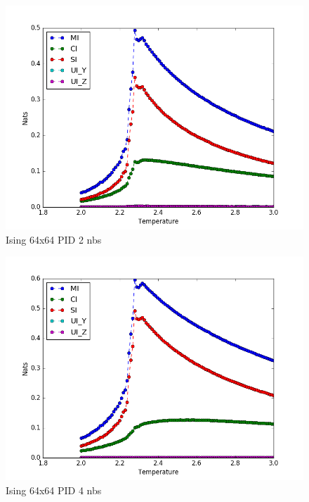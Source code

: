 \documentclass[12pt]{article}
\begin{document}
\begin{figure} [h!]
\begin{center}
\includegraphics[width=\textwidth]{ising-64-pid-2-nbs}
\caption{Ising 64x64 PID 2 nbs}
\label{fig:ising-64-pid-2-nbs}
\end{center}
\end{figure}

\begin{figure} [h!]
\begin{center}
\includegraphics[width=\textwidth]{ising-64-pid-4-nbs}
\caption{Ising 64x64 PID 4 nbs}
\label{fig:ising-64-pid-4-nbs}
\end{center}
\end{figure}
\end{document}
